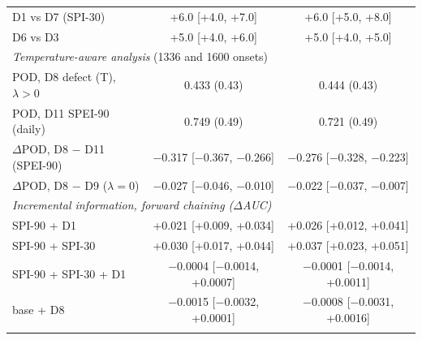 \begin{table}[tbp]
\begin{tabular*}{\textwidth}{@{\extracolsep\fill}lcc}
\quad D1 vs D7 (SPI-30) & +6.0 [+4.0, +7.0] & +6.0 [+5.0, +8.0] \\
\quad D6 vs D3 & +5.0 [+4.0, +6.0] & +5.0 [+4.0, +5.0] \\
\midrule
\multicolumn{3}{l}{\textit{Temperature-aware analysis} (1336 and 1600 onsets)}\\
\quad POD, D8 defect (T), $\lambda>0$ & 0.433 (0.43) & 0.444 (0.43) \\
\quad POD, D11 SPEI-90 (daily) & 0.749 (0.49) & 0.721 (0.49) \\
\quad $\Delta$POD, D8 $-$ D11 (SPEI-90) & $-$0.317 [$-$0.367, $-$0.266] & $-$0.276 [$-$0.328, $-$0.223] \\
\quad $\Delta$POD, D8 $-$ D9 ($\lambda=0$) & $-$0.027 [$-$0.046, $-$0.010] & $-$0.022 [$-$0.037, $-$0.007] \\
\midrule
\multicolumn{3}{l}{\textit{Incremental information, forward chaining ($\Delta$AUC)}}\\
\quad SPI-90 + D1 & +0.021 [+0.009, +0.034] & +0.026 [+0.012, +0.041] \\
\quad SPI-90 + SPI-30 & +0.030 [+0.017, +0.044] & +0.037 [+0.023, +0.051] \\
\quad SPI-90 + SPI-30 + D1 & $-$0.0004 [$-$0.0014, +0.0007] & $-$0.0001 [$-$0.0014, +0.0011] \\
\quad base + D8 & $-$0.0015 [$-$0.0032, +0.0001] & $-$0.0008 [$-$0.0031, +0.0016] \\
\botrule
\end{tabular*}
\end{table}
